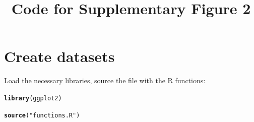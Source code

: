 \documentclass{article}\usepackage[]{graphicx}\usepackage[]{color}
\title{Code for Supplementary Figure 2}
\makeatletter
\newcommand{\hlstr}[1]{\textcolor[rgb]{0.192,0.494,0.8}{#1}}%
\newcommand{\hlstd}[1]{\textcolor[rgb]{0.345,0.345,0.345}{#1}}%
\newcommand{\hlkwd}[1]{\textcolor[rgb]{0.737,0.353,0.396}{\textbf{#1}}}%
\newenvironment{kframe}{%
 \def\at@end@of@kframe{}%
 \ifinner\ifhmode%
  \def\at@end@of@kframe{\end{minipage}}%
  \begin{minipage}{\columnwidth}%
 \fi\fi%
 \def\FrameCommand##1{\hskip\@totalleftmargin \hskip-\fboxsep
 \colorbox{shadecolor}{##1}\hskip-\fboxsep
     \hskip-\linewidth \hskip-\@totalleftmargin \hskip\columnwidth}%
 \MakeFramed {\advance\hsize-\width
   \@totalleftmargin\z@ \linewidth\hsize
   \@setminipage}}%
 {\par\unskip\endMakeFramed%
 \at@end@of@kframe}
\newenvironment{knitrout}{}{} %
\makeatother
\begin{document}
\maketitle



\section{Create datasets}

Load the necessary libraries, source the file with the R functions:
\begin{knitrout}
\color{fgcolor}\begin{kframe}
\begin{alltt}
\hlkwd{library}\hlstd{(ggplot2)}

\hlkwd{source}\hlstd{(}\hlstr{"functions.R"}\hlstd{)}
\end{alltt}
\end{kframe}
\end{knitrout}
\end{document}
